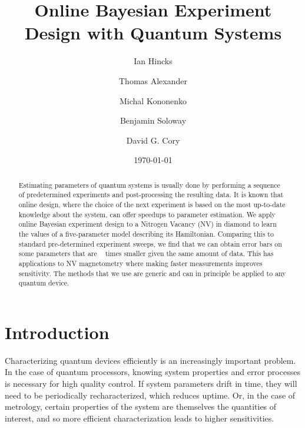 \documentclass[aps,nofootinbib,twocolumn,superscriptaddress]{revtex4}
\begin{document}
\title{Online Bayesian Experiment Design with Quantum Systems}

\author{Ian Hincks}
\affilUWAMath
\affilIQC

\author{Thomas Alexander}
\affilUWPhys
\affilIQC

\author{Michal Kononenko}
\affilTODO

\author{Benjamin Soloway}
\affilTODO

\author{David G. Cory}
\affilUWChem
\affilIQC
\affilPI
\affilCIFAR


\date{\today}

\begin{abstract}
Estimating parameters of quantum systems is usually done by performing 
a sequence of predetermined experiments and post-processing the resulting data.
It is known that online design, where the 
choice of the next experiment is based on
the most up-to-date knowledge about the system, 
can offer speedups to parameter estimation.
We apply online Bayesian experiment design to a Nitrogen
Vacancy (NV) in diamond to learn the values of a 
five-parameter model describing its Hamiltonian.
Comparing this to standard pre-determined experiment sweeps, 
we find that we can obtain error bars on some parameters that 
are \TODO~ times smaller given the same amount of data.
This has applications to NV magnetometry where making faster measurements
improves sensitivity.
The methods that we use are generic and can in principle be 
applied to any quantum device.
\end{abstract}

\maketitle




\section{Introduction}
\label{sec:intro}

Characterizing quantum devices efficiently is an increasingly 
important problem.
In the case of quantum processors, knowing system properties
and error processes is necessary for high quality control.
If system parameters drift in time, they will 
need to be periodically recharacterized, which reduces uptime.
Or, in the case of metrology, certain properties of the system are 
themselves the quantities of interest, and so more efficient 
characterization leads to higher sensitivities.
\end{document}
